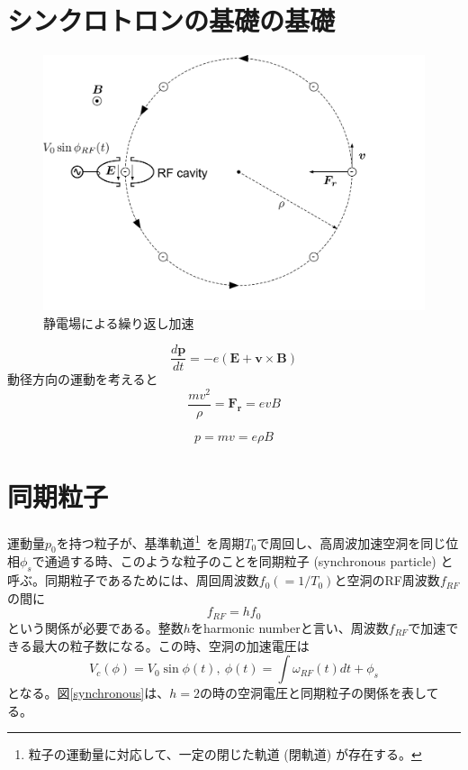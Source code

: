 \documentclass[10pt,a4paper]{ltjsarticle}
\begin{document}
\section{シンクロトロンの基礎の基礎}

\begin{figure}[hbt]
  \begin{center}
    \includegraphics[width=15cm,clip]{rf_circular.pdf}
    \caption{静電場による繰り返し加速}
   \label{rf_circular}
  \end{center}
\end{figure}

\begin{equation}
  \frac{d\bm{p}}{dt} = -e (\bm{E} + \bm{v}\times \bm{B})
\end{equation}
%
動径方向の運動を考えると
%
\begin{equation}
  \frac{m v^2}{\rho} = \bm{F_r} = e v B
\end{equation}

\begin{equation}
  p = mv = e \rho B 
\end{equation}
%
\section{同期粒子}
運動量$p_0$を持つ粒子が、基準軌道\footnote{粒子の運動量に対応して、一定の閉じた軌道 (閉軌道) が存在する。}\ を周期$T_0$で周回し、高周波加速空洞を同じ位相$\phi_s$で通過する時、このような粒子のことを同期粒子 (synchronous particle) と呼ぶ。同期粒子であるためには、周回周波数$f_0 (= 1/T_0)$と空洞のRF周波数$f_{RF}$の間に
%
\begin{equation}
    f_{RF} = h f_0
    \label{harmonic}
\end{equation}
%
という関係が必要である。整数$h$をharmonic numberと言い、周波数$f_{RF}$で加速できる最大の粒子数になる。この時、空洞の加速電圧は
%
\begin{equation}
    V_c (\phi) = V_0 \sin \phi(t),\:\phi(t) = \int\omega_{RF}(t) dt + \phi_s
\end{equation}
%
となる。図\ref{synchronous}は、$h=2$の時の空洞電圧と同期粒子の関係を表してる。
\end{document}
